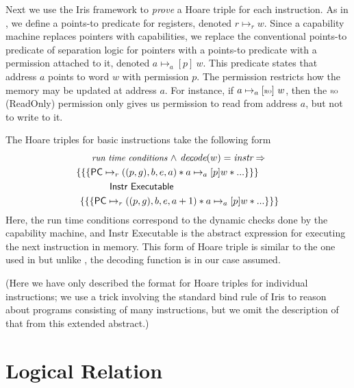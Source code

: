 \documentclass[sigplan,review]{acmart}\settopmatter{printfolios=true,printccs=false,printacmref=false}
\newcommand{\sep}{-\kern-.6em\raisebox{-.659ex}{*}\ }
\newcommand{\interp}[2]{(#1)(#2)}
\begin{document}
Next we use the Iris framework to \emph{prove} a Hoare triple for each instruction.
As in \cite{Jensen:2013}, we define a points-to predicate for registers, denoted $r \mapsto_r w$.
Since a capability machine replaces pointers with capabilities, we replace the conventional points-to predicate of separation logic for pointers with a points-to predicate with a permission attached to it, denoted
$a \mapsto_a[p]~w$. 
This predicate states that address $a$ points to word $w$ with permission $p$.
The permission restricts how the memory may be updated at address $a$.
For instance, if $a \mapsto_a[\textsc{\tiny RO}]~w$, then the $\textsc{\tiny RO}$ (ReadOnly)
permission only gives us permission to read from address $a$, but not to write to it.

The Hoare triples for basic instructions take the following form
\begin{align*}
\small
	\textit{run time conditions } \wedge &\textit{ decode}(w) = \emph{instr} \Rightarrow  \\
	\{\{\{ \textsf{PC} \mapsto_r ((p,g),b,e,a) &* a \mapsto_a[p] w * ... \}\}\} \\ 
	\textsf{Instr Executable }\\
	\{\{\{\textsf{PC} \mapsto_r ((p,g),b,e,a&+1) * a \mapsto_a[p] w * ... \}\}\}
\end{align*} 
Here, the run time conditions correspond to the dynamic checks done by the capability machine, and \textsf{Instr Executable} is the abstract expression for executing the next instruction in memory.
This form of Hoare triple is similar to the one used in \cite{Jensen:2013} but
unlike \cite{Jensen:2013}, the decoding function is in our case assumed.

(Here we have only described the format for Hoare triples for individual instructions; we use a trick involving the standard bind rule of Iris to reason about programs consisting of many instructions, but we omit the description of that from this extended abstract.)

\section{Logical Relation}


\end{document}
